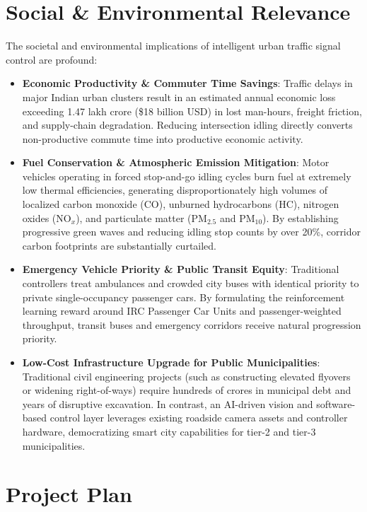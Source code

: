 \documentclass[12pt,a4paper,oneside]{report}
\begin{document}
\section{Social \& Environmental Relevance}
\label{sec:social_env}
The societal and environmental implications of intelligent urban traffic signal control are profound:
\begin{itemize}
    \item \textbf{Economic Productivity \& Commuter Time Savings}: Traffic delays in major Indian urban clusters result in an estimated annual economic loss exceeding 1.47 lakh crore (\$18 billion USD) in lost man-hours, freight friction, and supply-chain degradation. Reducing intersection idling directly converts non-productive commute time into productive economic activity.
    \item \textbf{Fuel Conservation \& Atmospheric Emission Mitigation}: Motor vehicles operating in forced stop-and-go idling cycles burn fuel at extremely low thermal efficiencies, generating disproportionately high volumes of localized carbon monoxide (CO), unburned hydrocarbons (HC), nitrogen oxides ($\text{NO}_x$), and particulate matter ($\text{PM}_{2.5}$ and $\text{PM}_{10}$). By establishing progressive green waves and reducing idling stop counts by over 20\%, corridor carbon footprints are substantially curtailed.
    \item \textbf{Emergency Vehicle Priority \& Public Transit Equity}: Traditional controllers treat ambulances and crowded city buses with identical priority to private single-occupancy passenger cars. By formulating the reinforcement learning reward around IRC Passenger Car Units and passenger-weighted throughput, transit buses and emergency corridors receive natural progression priority.
    \item \textbf{Low-Cost Infrastructure Upgrade for Public Municipalities}: Traditional civil engineering projects (such as constructing elevated flyovers or widening right-of-ways) require hundreds of crores in municipal debt and years of disruptive excavation. In contrast, an AI-driven vision and software-based control layer leverages existing roadside camera assets and controller hardware, democratizing smart city capabilities for tier-2 and tier-3 municipalities.
\end{itemize}

\section{Project Plan}
\label{sec:project_plan}
\end{document}
